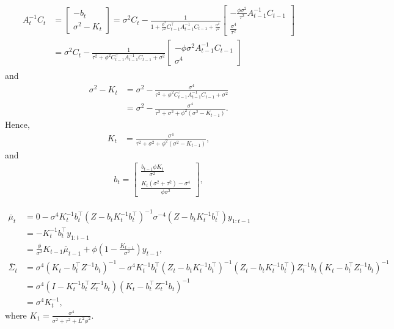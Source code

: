 \begin{align}
\begin{split}
A_{t}^{-1}C_{t} &= \left[ \begin{array}{c} -b_{t} \\ \sigma^2-K_{t}\end{array} \right] = \sigma^2C_{t}-\frac{1}{1+\frac{\phi^2}{\tau^2} C_{t-1}^\top A_{t-1}^{-1}C_{t-1}+\frac{\sigma^2}{\tau^2}} \left[\begin{array}{c} -\frac{\phi\sigma^2}{\tau^2} A_{t-1}^{-1}C_{t-1} \\\frac{\sigma^4}{\tau^2} \end{array}\right] \\
&= \sigma^2C_{t}-\frac{1}{\tau^2+\phi^2C_{t-1}^\top A_{t-1}^{-1}C_{t-1}+\sigma^2} \left[\begin{array}{c} -\phi\sigma^2 A_{t-1}^{-1}C_{t-1} \\ \sigma^4 \end{array}\right]
\end{split}
\end{align}
and
\begin{align*}
\sigma^2-K_{t} &= \sigma^2 - \frac{\sigma^4}{\tau^2+\phi^2C_{t-1}^\top A_{t-1}^{-1}C_{t-1}+\sigma^2} \\
&= \sigma^2 - \frac{\sigma^4}{\tau^2+ \sigma^2 + \phi^2\left(\sigma^2-K_{t-1}\right)}.
\end{align*}
Hence, 
\begin{align}
K_{t}  &=\frac{\sigma^4}{\tau^2+\sigma^2+\phi^2\left(\sigma^2-K_{t-1}\right)},
\end{align}
and
\begin{align*}b_{t} = 
\begin{bmatrix}
\frac{b_{t-1}\phi K_{t}}{\sigma^2} \\ \frac{K_{t}\left(\sigma^2+\tau^2\right)-\sigma^4 }{\phi\sigma^2}
\end{bmatrix},
\end{align*}

\begin{align*}
\bar{\mu}_{t}      &= 0-\sigma^4 K_t^{-1}b_t^\top \left(Z-b_tK_t^{-1}b_t^\top\right)^{-1} \sigma^{-4} \left(Z-b_tK_t^{-1}b_t^\top\right) y_{1:t-1} \\
					 & =-K_t^{-1}b_t^\top y_{1:t-1} \\
					 & = \frac{\phi}{\sigma^2}K_{t-1}\bar{\mu}_{t-1} + \phi \left(1 - \frac{K_{t-1}}{\sigma^2}\right)y_{t-1}, \\
\bar{\Sigma}_{t} &= \sigma^4\left(K_t-b_t^\top Z^{-1}b_t\right)^{-1}- \sigma^4K_t^{-1}b_t^\top \left(Z_t-b_tK_t^{-1}b_t^\top\right)^{-1} \left(Z_t-b_tK_t^{-1}b_t^\top\right)Z_t^{-1}b_t\left(K_t-b_t^\top Z_t^{-1}b_t\right)^{-1}\\
                     & = \sigma^4\left(I-K_t^{-1}b_t^\top Z_t^{-1}b_t\right)\left(K_t-b_t^\top Z_t^{-1}b_t\right)^{-1} \\
                     & = \sigma^4K_{t}^{-1},
\end{align*}
where $K_1=\frac{\sigma^4}{\sigma^2+\tau^2+L^2\phi^2}$.



